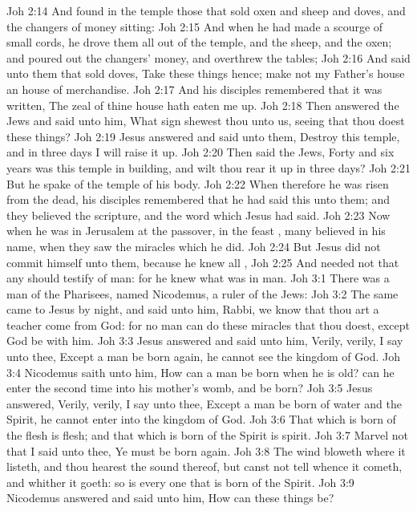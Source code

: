 \vs Joh 2:14 And found in the temple those that sold oxen and sheep and doves, and the changers of money sitting:
\vs Joh 2:15 And when he had made a scourge of small cords, he drove them all out of the temple, and the sheep, and the oxen; and poured out the changers' money, and overthrew the tables;
\vs Joh 2:16 And said unto them that sold doves, Take these things hence; make not my Father's house an house of merchandise.
\vs Joh 2:17 And his disciples remembered that it was written, The zeal of thine house hath eaten me up.
\vs Joh 2:18 Then answered the Jews and said unto him, What sign shewest thou unto us, seeing that thou doest these things?
\vs Joh 2:19 Jesus answered and said unto them, Destroy this temple, and in three days I will raise it up.
\vs Joh 2:20 Then said the Jews, Forty and six years was this temple in building, and wilt thou rear it up in three days?
\vs Joh 2:21 But he spake of the temple of his body.
\vs Joh 2:22 When therefore he was risen from the dead, his disciples remembered that he had said this unto them; and they believed the scripture, and the word which Jesus had said.
\vs Joh 2:23 Now when he was in Jerusalem at the passover, in the feast , many believed in his name, when they saw the miracles which he did.
\vs Joh 2:24 But Jesus did not commit himself unto them, because he knew all ,
\vs Joh 2:25 And needed not that any should testify of man: for he knew what was in man.
\vs Joh 3:1 There was a man of the Pharisees, named Nicodemus, a ruler of the Jews:
\vs Joh 3:2 The same came to Jesus by night, and said unto him, Rabbi, we know that thou art a teacher come from God: for no man can do these miracles that thou doest, except God be with him.
\vs Joh 3:3 Jesus answered and said unto him, Verily, verily, I say unto thee, Except a man be born again, he cannot see the kingdom of God.
\vs Joh 3:4 Nicodemus saith unto him, How can a man be born when he is old? can he enter the second time into his mother's womb, and be born?
\vs Joh 3:5 Jesus answered, Verily, verily, I say unto thee, Except a man be born of water and  the Spirit, he cannot enter into the kingdom of God.
\vs Joh 3:6 That which is born of the flesh is flesh; and that which is born of the Spirit is spirit.
\vs Joh 3:7 Marvel not that I said unto thee, Ye must be born again.
\vs Joh 3:8 The wind bloweth where it listeth, and thou hearest the sound thereof, but canst not tell whence it cometh, and whither it goeth: so is every one that is born of the Spirit.
\vs Joh 3:9 Nicodemus answered and said unto him, How can these things be?
